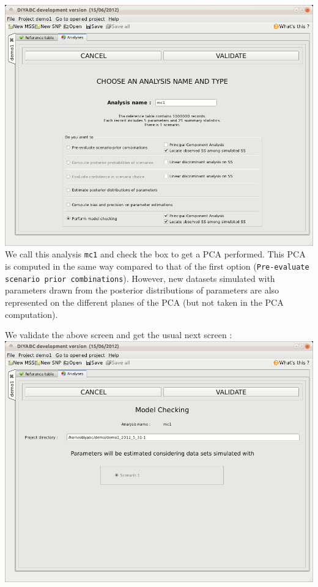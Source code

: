 \includegraphics[scale=0.32]{gui_pictures/Capture-DIYABC-53.png} \\

We call this analysis \texttt{mc1} and check the box to get a PCA performed. This PCA is computed in the same way compared to that of the first option (\texttt{Pre-evaluate scenario prior combinations}). However, new datasets simulated with parameters drawn from the posterior distributions of parameters are also represented on the different planes of the PCA (but not taken in the PCA  computation). 

We validate the above screen and get the usual next screen :\\

\includegraphics[scale=0.35]{gui_pictures/Capture-DIYABC-54.png} \\

